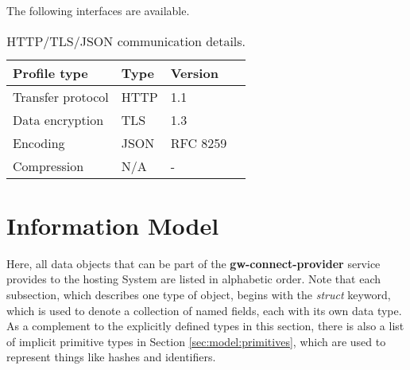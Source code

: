 \documentclass[a4paper]{arrowhead}
\begin{document}
The following interfaces are available.


\begin{table}[ht!]
  \centering
  \begin{tabular}{|l|l|l|l|}
    \rowcolor{gray!33} Profile type & Type & Version \\ \hline
    Transfer protocol & HTTP & 1.1 \\ \hline
    Data encryption & TLS & 1.3 \\ \hline
    Encoding & JSON & RFC 8259 \cite{rfc8259} \\ \hline
    Compression & N/A & - \\ \hline
  \end{tabular}
  \caption{HTTP/TLS/JSON communication details.}
  \label{tab:comunication_semantics_profile}
\end{table}

\clearpage

\section{Information Model}
\label{sec:model}

Here, all data objects that can be part of the \textbf{gw-connect-provider} service provides to the hosting System are listed in alphabetic order. Note that each subsection, which describes one type of object, begins with the \textit{struct} keyword, which is used to denote a collection of named fields, each with its own data type. As a complement to the explicitly defined types in this section, there is also a list of implicit primitive types in Section \ref{sec:model:primitives}, which are used to represent things like hashes and identifiers.

\label{sec:model:ConnectionRequest}
 
\end{document}

